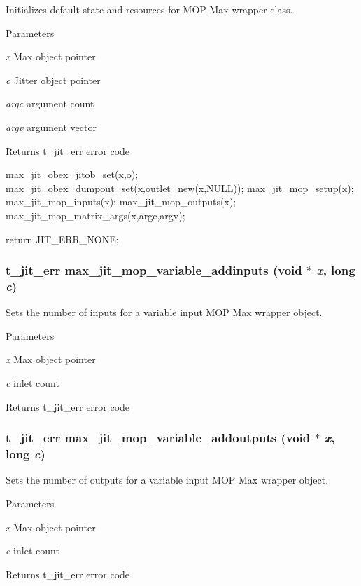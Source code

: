 Initializes default state and resources for MOP Max wrapper class. 
\begin{DoxyParams}{Parameters}
\item[{\em x}]Max object pointer \item[{\em o}]Jitter object pointer \item[{\em argc}]argument count \item[{\em argv}]argument vector\end{DoxyParams}
\begin{DoxyReturn}{Returns}
t\_\-jit\_\-err error code
\end{DoxyReturn}

\begin{DoxyCode}
    max_jit_obex_jitob_set(x,o);
    max_jit_obex_dumpout_set(x,outlet_new(x,NULL));
    max_jit_mop_setup(x);
    max_jit_mop_inputs(x);
    max_jit_mop_outputs(x);
    max_jit_mop_matrix_args(x,argc,argv);

    return JIT_ERR_NONE; 
\end{DoxyCode}
 \hypertarget{group__maxmopmod_ga3e12ca35fc39ddd1209156912708f03c}{
\subsubsection[{max\_\-jit\_\-mop\_\-variable\_\-addinputs}]{\setlength{\rightskip}{0pt plus 5cm}t\_\-jit\_\-err max\_\-jit\_\-mop\_\-variable\_\-addinputs (void $\ast$ {\em x}, \/  long {\em c})}}
\label{group__maxmopmod_ga3e12ca35fc39ddd1209156912708f03c}


Sets the number of inputs for a variable input MOP Max wrapper object. 
\begin{DoxyParams}{Parameters}
\item[{\em x}]Max object pointer \item[{\em c}]inlet count\end{DoxyParams}
\begin{DoxyReturn}{Returns}
t\_\-jit\_\-err error code 
\end{DoxyReturn}
\hypertarget{group__maxmopmod_ga7dab1b1ecbcea42dcdb18fc929385fa9}{
\subsubsection[{max\_\-jit\_\-mop\_\-variable\_\-addoutputs}]{\setlength{\rightskip}{0pt plus 5cm}t\_\-jit\_\-err max\_\-jit\_\-mop\_\-variable\_\-addoutputs (void $\ast$ {\em x}, \/  long {\em c})}}
\label{group__maxmopmod_ga7dab1b1ecbcea42dcdb18fc929385fa9}


Sets the number of outputs for a variable input MOP Max wrapper object. 
\begin{DoxyParams}{Parameters}
\item[{\em x}]Max object pointer \item[{\em c}]inlet count\end{DoxyParams}
\begin{DoxyReturn}{Returns}
t\_\-jit\_\-err error code 
\end{DoxyReturn}
